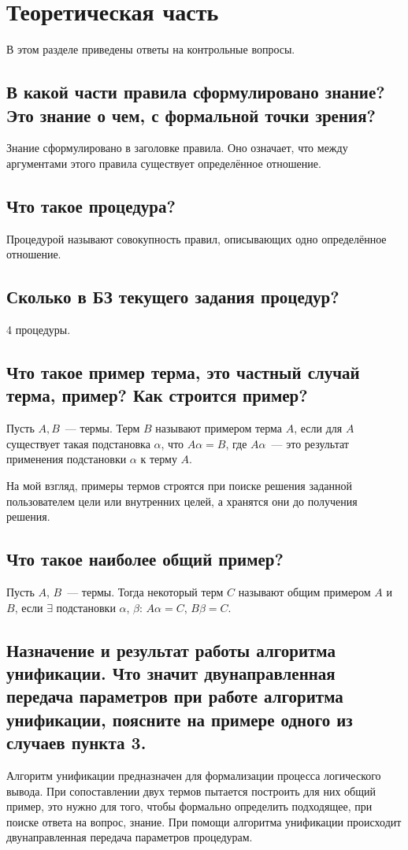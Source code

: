 \chapter{Теоретическая часть}

В этом разделе приведены ответы на контрольные вопросы.

\section{В какой части правила сформулировано знание? Это знание о чем, с формальной точки зрения?}
Знание сформулировано в заголовке правила. Оно означает, что между аргументами этого правила существует определённое отношение.

\section{Что такое процедура?}
Процедурой называют совокупность правил, описывающих одно определённое отношение.

\section{Сколько в БЗ текущего задания процедур?}
4 процедуры.

\section{Что такое пример терма, это частный случай терма, пример? Как строится пример?}

Пусть $A, B$~--- термы. Терм $B$ называют примером терма $A$, если для $A$ существует такая подстановка $\alpha$, что $A\alpha= B$, где $A\alpha$~--- это результат применения подстановки $\alpha$ к терму $A$.

На мой взгляд, примеры термов строятся при поиске решения заданной пользователем цели или внутренних целей, а хранятся они до получения решения.

\section{Что такое наиболее общий пример?}
Пусть $A$, $B$~--- термы. Тогда некоторый терм $C$ называют общим примером $A$ и $B$, если $\exists$ подстановки $\alpha$, $\beta$: $A\alpha = C$, $B\beta = C$.

\section{Назначение и результат работы алгоритма унификации. Что значит двунаправленная передача параметров при работе алгоритма унификации, поясните на примере одного из случаев пункта 3.}
Алгоритм унификации предназначен для формализации процесса логического вывода. При сопоставлении двух термов пытается построить для них общий пример, это нужно для того, чтобы формально определить подходящее, при поиске ответа на вопрос, знание. При помощи алгоритма унификации происходит двунаправленная передача параметров процедурам.

